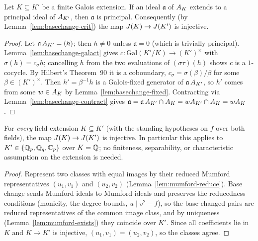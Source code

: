 \begin{lemma}
\label{lem:basechange-galois}
\leanok
{}
Let $K \subseteq K'$ be a finite Galois extension. If an ideal $\mathfrak a$ of $A_{K}$
extends to a principal ideal of $A_{K'}$, then $\mathfrak a$ is principal. Consequently
(by Lemma~\ref{lem:basechange-crit}) the map $J(K) \to J(K')$ is injective.
\end{lemma}
\begin{proof}
\leanok
Let $\mathfrak a\,A_{K'} = (h)$; then $h \ne 0$ unless $\mathfrak a = 0$ (which is
trivially principal). Lemma~\ref{lem:basechange-galact} gives
$c \colon \mathrm{Gal}(K'/K) \to (K')^\times$ with $\sigma(h) = c_\sigma h$; cancelling
$h$ from the two evaluations of $(\sigma\tau)(h)$ shows $c$ is a $1$-cocycle. By
Hilbert's Theorem~90 it is a coboundary, $c_\sigma = \sigma(\beta)/\beta$ for some
$\beta \in (K')^\times$. Then $h' = \beta^{-1} h$ is a Galois-fixed generator of
$\mathfrak a\,A_{K'}$, so $h'$ comes from some $w \in A_{K}$ by
Lemma~\ref{lem:basechange-fixed}. Contracting via Lemma~\ref{lem:basechange-contract}
gives $\mathfrak a = \mathfrak a\,A_{K'} \cap A_{K} = wA_{K'} \cap A_{K} = wA_{K}$.
\end{proof}

\begin{theorem}
\label{thm:basechange-inj}
\leanok
{}
For \emph{every} field extension $K \subseteq K'$ (with the standing hypotheses on $f$
over both fields), the map $J(K) \to J(K')$ is injective. In particular this applies
to $K' \in \{\mathbb{Q}_p, \mathbb{Q}_q, \mathbb{C}_p\}$ over $K = \mathbb{Q}$; no finiteness, separability, or
characteristic assumption on the extension is needed.
\end{theorem}
\begin{proof}
\leanok
{}
Represent two classes with equal images by their reduced Mumford representatives
$(u_1, v_1)$ and $(u_2, v_2)$ (Lemma~\ref{lem:mumford-reduce}). Base change sends
Mumford ideals to Mumford ideals and preserves the reducedness conditions (monicity,
the degree bounds, $u \mid v^2 - f$), so the base-changed pairs are reduced
representatives of the common image class, and by uniqueness
(Lemma~\ref{lem:mumford-exists}) they coincide over $K'$. Since all coefficients lie in
$K$ and $K \to K'$ is injective, $(u_1, v_1) = (u_2, v_2)$, so the classes agree.
\end{proof}

